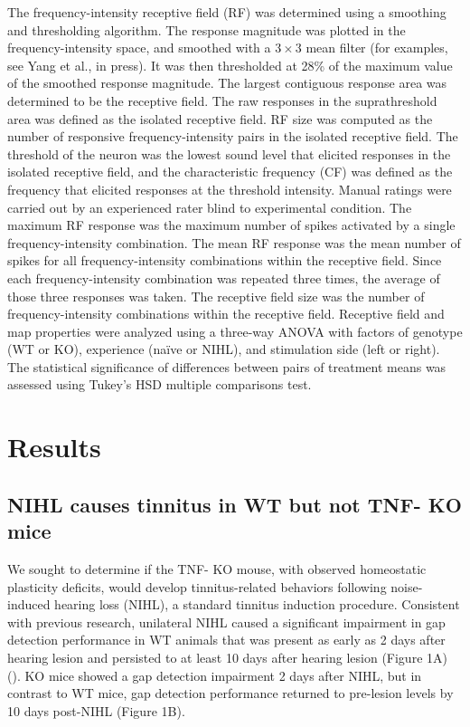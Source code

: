 The frequency-intensity receptive field (RF) was determined using a smoothing and thresholding algorithm. The response magnitude was plotted in the frequency-intensity space, and smoothed with a $3\times3$ mean filter (for examples, see Yang et al., in press). It was then thresholded at 28\% of the maximum value of the smoothed response magnitude. The largest contiguous response area was determined to be the receptive field. The raw responses in the suprathreshold area was defined as the isolated receptive field. RF size was computed as the number of responsive frequency-intensity pairs in the isolated receptive field. The threshold of the neuron was the lowest sound level that elicited responses in the isolated receptive field, and the characteristic frequency (CF) was defined as the frequency that elicited responses at the threshold intensity. Manual ratings were carried out by an experienced rater blind to experimental condition. The maximum RF response was the maximum number of spikes activated by a single frequency-intensity combination. The mean RF response was the mean number of spikes for all frequency-intensity combinations within the receptive field. Since each frequency-intensity combination was repeated three times, the average of those three responses was taken. The receptive field size was the number of frequency-intensity combinations within the receptive field.
Receptive field and map properties were analyzed using a three-way ANOVA with factors of genotype (WT or KO), experience (na\"ive or NIHL), and stimulation side (left or right). The statistical significance of differences between pairs of treatment means was assessed using Tukey's HSD multiple comparisons test.

\section{Results}

\subsection{NIHL causes tinnitus in WT but not TNF-\textalpha{} KO mice}

We sought to determine if the TNF-\textalpha{} KO mouse, with observed homeostatic plasticity deficits, would develop tinnitus-related behaviors following noise-induced hearing loss (NIHL), a standard tinnitus induction procedure. Consistent with previous research, unilateral NIHL caused a significant impairment in gap detection performance in WT animals that was present as early as 2 days after hearing lesion and persisted to at least 10 days after hearing lesion (Figure 1A) (\cite{Turner2006, Llano2012}). KO mice showed a gap detection impairment 2 days after NIHL, but in contrast to WT mice, gap detection performance returned to pre-lesion levels by 10 days post-NIHL (Figure 1B).

